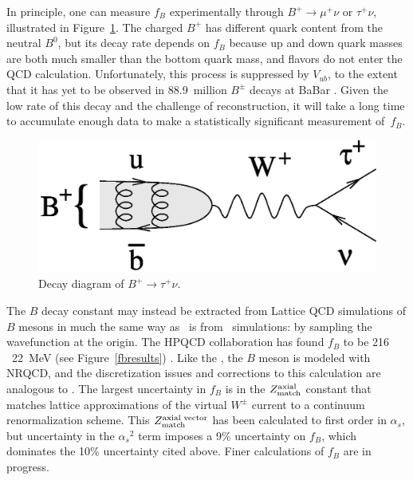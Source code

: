 \documentclass{cornell}
\begin{document}
In principle, one can measure $f_B$ experimentally through $B^+ \to
\mu^+ \nu$ or $\tau^+ \nu$, illustrated in Figure~\ref{btomunu}.  The
charged $B^+$ has different quark content from the neutral $B^0$, but
its decay rate depends on $f_B$ because up and down quark masses are
both much smaller than the bottom quark mass, and flavors do not enter
the QCD calculation.  Unfortunately, this process is suppressed by
$V_{ub}$, to the extent that it has yet to be observed in 88.9~million
$B^\pm$ decays at BaBar \cite{btaunu}.  Given the low rate of this
decay and the challenge of reconstruction, it will take a long time to
accumulate enough data to make a statistically significant measurement
of~$f_B$.

\begin{figure}[p]
  \begin{center}
    \includegraphics[width=0.5\linewidth]{btomunu}
  \end{center}
  \caption[Decay diagram of $B^+ \to \tau^+ \nu$]{\label{btomunu}
  Decay diagram of $B^+ \to \tau^+ \nu$.}
\end{figure}

The $B$ decay constant may instead be extracted from Lattice QCD
simulations of $B$ mesons in much the same way as \gee\ is from \ups\
simulations: by sampling the wavefunction at the origin.  The HPQCD
collaboration has found $f_B$ to be 216 \PM\ 22~MeV (see
Figure~\ref{fbresults}) \cite{fb}.  Like the \ups, the $B$ meson is
modeled with NRQCD, and the discretization issues and corrections to
this calculation are analogous to \gee.  The largest uncertainty in
$f_B$ is in the $Z_{\mbox{\scriptsize match}}^{\mbox{\scriptsize axial}}$ constant that
matches lattice approximations of the virtual $W^\pm$ current to a
continuum renormalization scheme.  This $Z_{\mbox{\scriptsize match}}^{\mbox{\scriptsize axial
vector}}$ has been calculated to first order in $\alpha_s$, but
uncertainty in the ${\alpha_s}^2$ term imposes a 9\% uncertainty on
$f_B$, which dominates the 10\% uncertainty cited above.  Finer
calculations of $f_B$ are in progress.
\end{document}

